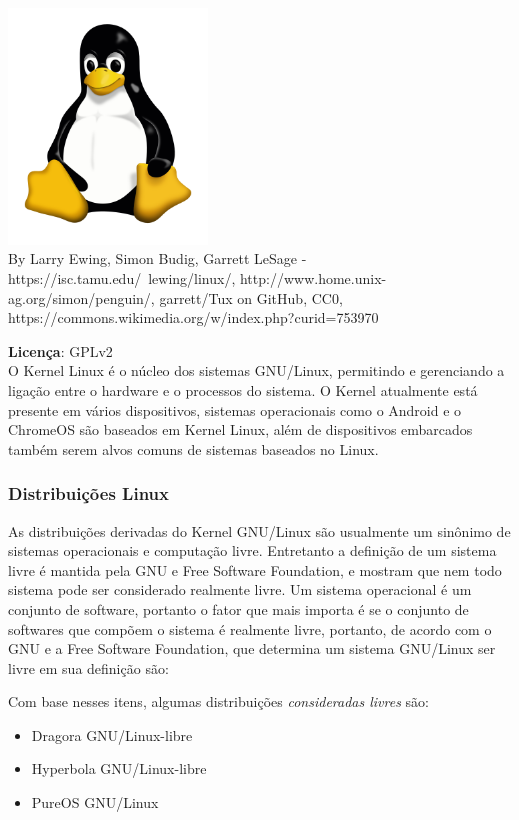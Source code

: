 \documentclass[12pt, a4paper]{report}
\begin{document}
\begin{center}
  \includegraphics[width=200px]{imgs/Tux.png}\\
  \footnotesize{By Larry Ewing, Simon Budig, Garrett LeSage - https://isc.tamu.edu/~lewing/linux/, http://www.home.unix-ag.org/simon/penguin/, garrett/Tux on GitHub, CC0, https://commons.wikimedia.org/w/index.php?curid=753970}
\end{center}

\large\textbf{Licença}: GPLv2\\

O Kernel Linux é o núcleo dos sistemas GNU/Linux, permitindo e gerenciando a ligação entre o hardware e o processos do sistema. O Kernel atualmente está presente em vários dispositivos, sistemas operacionais como o Android e o ChromeOS são baseados em Kernel Linux, além de dispositivos embarcados também serem alvos comuns de sistemas baseados no Linux.

\subsubsection{Distribuições Linux}

As distribuições derivadas do Kernel GNU/Linux são usualmente um sinônimo de sistemas operacionais e computação livre. Entretanto a definição de um sistema livre é mantida pela GNU e Free Software Foundation, e mostram que nem todo sistema pode ser considerado realmente livre.
Um sistema operacional é um conjunto de software, portanto o fator que mais importa é se o conjunto de softwares que compõem o sistema é realmente livre, portanto, de acordo com o GNU e a Free Software Foundation, que determina um sistema GNU/Linux ser livre em sua definição são:


Com base nesses itens, algumas distribuições \emph{consideradas livres} são:

\begin{itemize}

  \item{Dragora GNU/Linux-libre}

  \item{Hyperbola GNU/Linux-libre}

  \item{PureOS GNU/Linux}

\end{itemize}
\end{document}
